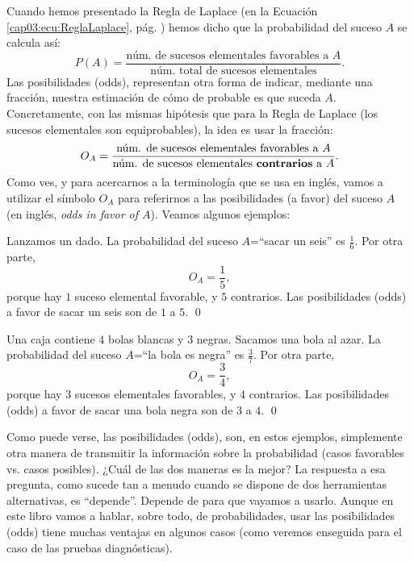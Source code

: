 Cuando hemos presentado la Regla de Laplace (en la Ecuación \ref{cap03:ecu:ReglaLaplace}, pág. \pageref{cap03:ecu:ReglaLaplace}) hemos dicho que la probabilidad del suceso $A$ se calcula así:
\[
P(A)=\dfrac{\mbox{núm. de sucesos elementales favorables a $A$}}{\mbox{núm. total de sucesos elementales}}.
\]
Las posibilidades (odds), representan otra forma de indicar, mediante una fracción, nuestra estimación de cómo de probable es que suceda $A$. Concretamente, con las mismas hipótesis que para la Regla de Laplace (los sucesos elementales son equiprobables), la idea es usar la fracción:
\begin{equation}\label{cap03:EcuacionTipoLaplaceParaOdds}
O_A=
\dfrac{\mbox{núm. de sucesos elementales favorables a $A$}}
{\mbox{núm. de sucesos elementales {\bf contrarios} a $A$}}.
\end{equation}
Como ves, y para acercarnos a la terminología que se usa en inglés, vamos a utilizar el símbolo $O_A$  para referirnos a las posibilidades (a favor) del suceso $A$ (en inglés, {\em odds in favor of $A$}). Veamos algunos ejemplos:
\begin{ejemplo}\label{cap03:ejem:OddsVsProbabilidades01}
Lanzamos un dado. La probabilidad del suceso $A$=``sacar un seis'' es $\frac{1}{6}$. Por otra parte,
\[O_A=\dfrac{1}{5},\]
porque hay $1$ suceso elemental favorable, y $5$ contrarios. Las posibilidades (odds) a favor de sacar un seis son de $1$ a $5$.
\qed
\end{ejemplo}
\begin{ejemplo}\label{cap03:ejem:OddsVsProbabilidades02}
Una caja contiene $4$ bolas blancas y $3$ negras. Sacamos una bola al azar. La probabilidad del suceso $A$=``la bola es negra'' es $\frac{3}{7}$. Por otra parte,
\[O_A=\dfrac{3}{4},\]
porque hay $3$ sucesos elementales favorables, y $4$ contrarios. Las posibilidades (odds) a favor de sacar una bola negra son de $3$ a $4$.
\qed
\end{ejemplo}
Como puede verse, las posibilidades (odds), son, en estos ejemplos, simplemente otra manera de transmitir la información sobre la probabilidad (casos favorables vs. casos posibles). ¿Cuál de las dos maneras es la mejor? La respuesta a esa pregunta, como sucede tan a menudo cuando se dispone de dos herramientas alternativas, es ``depende''. Depende de para que vayamos a usarlo. Aunque en este libro vamos a hablar, sobre todo, de probabilidades, usar las posibilidades (odds) tiene muchas ventajas en algunos casos (como veremos enseguida para el caso de las pruebas diagnósticas).

